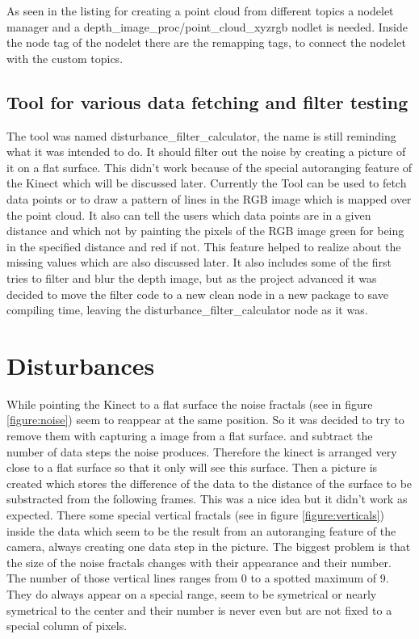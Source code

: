 As seen in the listing for creating a point cloud from different topics a nodelet manager and a 
depth\_image\_proc/point\_cloud\_xyzrgb nodlet is needed. Inside the node tag of the nodelet
there are the remapping tags, to connect the nodelet with the custom topics.

\subsection{Tool for various data fetching and filter testing}
The tool was named disturbance\_filter\_calculator, the name is still reminding what it was intended to do. It should
filter out the noise by creating a picture of it on a flat surface. This didn't work because of the special autoranging
feature of the Kinect which will be discussed later. Currently the Tool can be used to fetch data points or to
draw a pattern of lines in the RGB image which is mapped over the point cloud. It also can tell the users which data points
are in a given distance and which not by painting the pixels of the RGB image green for being in the specified distance
and red if not. This feature helped to realize about the missing values which are also discussed later. It also includes
some of the first tries to filter and blur the depth image, but as the project advanced it was decided to move the 
filter code to a new clean node in a new package to save compiling time, leaving the disturbance\_filter\_calculator 
node as it was.


\section{Disturbances}
While pointing the Kinect to a flat surface the noise fractals (see in figure \vref{figure:noise}) 
seem to reappear at the same position. So it was decided to try to remove them with capturing a image from a flat surface.
and subtract the number of data steps the noise produces. Therefore the kinect is arranged very close to a flat surface 
so that it only will see this surface. Then a picture is created which stores the difference of the data to the 
distance of the surface to be substracted from the following frames.
This was a nice idea but it didn't work as expected. There some special vertical fractals (see in figure \vref{figure:verticals}) 
inside the data which seem to be the result from an autoranging feature of the camera, 
always creating one data step in the picture. The biggest problem is that the size of the noise fractals changes 
with their appearance and their number. The number of those vertical lines ranges from 0 to a spotted maximum of 9. 
They do always appear on a special range, seem to be symetrical or 
nearly symetrical to the center and their number is never even but are not fixed to a special column of pixels. 

